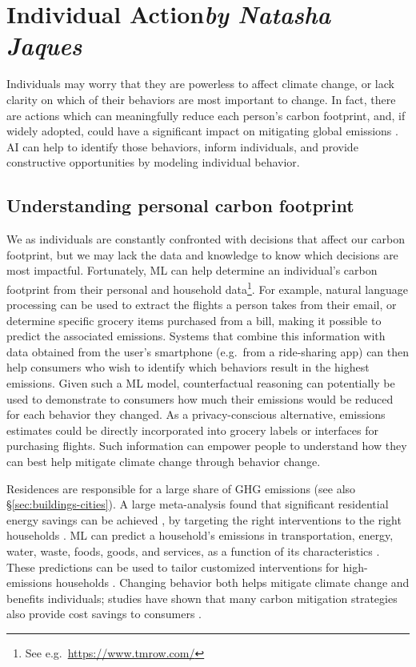 \documentclass[11pt]{report}
\begin{document}
\section{Individual Action\texorpdfstring{\hfill\textit{by Natasha Jaques}}{}}
\label{sec:tools-individuals}
Individuals may worry that they are powerless to affect climate change, or lack clarity on which of their behaviors are most important to change. In fact, there are actions which can meaningfully reduce each person's carbon footprint, and, if widely adopted, could have a significant impact on mitigating global emissions \cite{ccneedsbehaviorchange,hawken2017drawdown}. AI can help to identify those behaviors, inform individuals, and provide constructive opportunities by modeling individual behavior. 

\subsection{Understanding personal carbon footprint}
\label{sec:personal_carbon_footprint}
We as individuals are constantly confronted with decisions that affect our carbon footprint, but we may lack the data and knowledge to know which decisions are most impactful. Fortunately, ML can help determine an individual's carbon footprint from their personal and household data\footnote{See e.g.~\url{https://www.tmrow.com/}}. For example, natural language processing can be used to extract the flights a person takes from their email, or determine specific grocery items purchased from a bill, making it possible to predict the associated emissions. Systems that combine this information with data obtained from the user's smartphone (e.g.~from a ride-sharing app) can then help consumers who wish to identify which behaviors result in the highest emissions. Given such a ML model, counterfactual reasoning can potentially be used to demonstrate to consumers how much their emissions would be reduced for each behavior they changed. As a privacy-conscious alternative, emissions estimates could be directly incorporated into grocery labels \cite{supermarketfuture} or interfaces for purchasing flights. Such information can empower people to understand how they can best help mitigate climate change through behavior change.

Residences are responsible for a large share of GHG emissions \cite{ipcc_global_2018} (see also \S\ref{sec:buildings-cities}). 
A large meta-analysis found that significant residential energy savings can be achieved \cite{ehrhardt2010advanced}, by targeting the right interventions to the right households \cite{albert2016predictive, allcott2011social, allcott2014short}. ML can predict a household's emissions in transportation, energy, water, waste, foods, goods, and services, as a function of its characteristics \cite{jones2011quantifying}. These predictions can be used to tailor customized interventions for high-emissions households \cite{jones2014spatial}.
Changing behavior both helps mitigate climate change and benefits individuals; studies have shown that many carbon mitigation strategies also provide cost savings to consumers \cite{jones2011quantifying}. 
\end{document}
